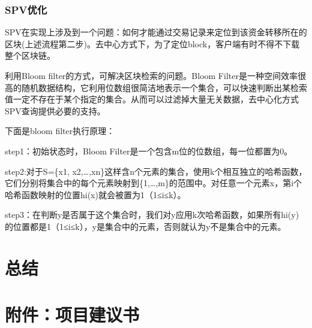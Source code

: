 \documentclass[withoutpreface,bwprint]{cumcmthesis} %
\begin{document}
\subsubsection{SPV优化}

SPV在实现上涉及到一个问题：如何才能通过交易记录来定位到该资金转移所在的区块(上述流程第二步)。去中心方式下，为了定位block，客户端有时不得不下载整个区块链。

利用Bloom filter的方式，可解决区块检索的问题。Bloom Filter是一种空间效率很高的随机数据结构，它利用位数组很简洁地表示一个集合，可以快速判断出某检索值一定不存在于某个指定的集合。从而可以过滤掉大量无关数据，去中心化方式SPV查询提供必要的支持。

下面是bloom filter执行原理：

step1：初始状态时，Bloom Filter是一个包含m位的位数组，每一位都置为0。

step2:对于S=\{x1, x2,…,xn\}这样含n个元素的集合，使用k个相互独立的哈希函数，它们分别将集合中的每个元素映射到\{1,…,m\}的范围中。对任意一个元素x，第i个哈希函数映射的位置hi(x)就会被置为1（1≤i≤k）。   

step3：在判断y是否属于这个集合时，我们对y应用k次哈希函数，如果所有hi(y)的位置都是1（1≤i≤k），y是集合中的元素，否则就认为y不是集合中的元素。

\section{总结}

\section*{附件：项目建议书}
\end{document}
